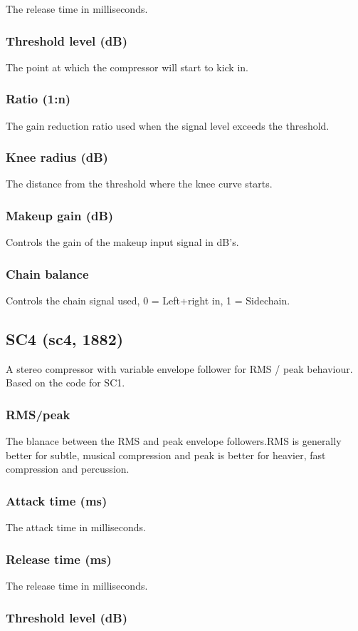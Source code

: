 \documentclass[11pt]{article}
\begin{document}
The release time in milliseconds.\subsubsection*{Threshold level (dB)}
The point at which the compressor will start to kick in.\subsubsection*{Ratio (1:n)}
The gain reduction ratio used when the signal level exceeds the threshold.\subsubsection*{Knee radius (dB)}
The distance from the threshold where the knee curve starts.\subsubsection*{Makeup gain (dB)}
Controls the gain of the makeup input signal in dB's.\subsubsection*{Chain balance}
Controls the chain signal used, 0 = Left+right in, 1 = Sidechain.\subsection{SC4 (sc4, 1882)\label{sc4}\label{id1882}}
A stereo compressor with variable envelope follower for RMS / peak behaviour. Based on the code for SC1.\subsubsection*{RMS/peak}
The blanace between the RMS and peak envelope followers.RMS is generally better for subtle, musical compression and peak is better for heavier, fast compression and percussion.\subsubsection*{Attack time (ms)}
The attack time in milliseconds.\subsubsection*{Release time (ms)}
The release time in milliseconds.\subsubsection*{Threshold level (dB)}
\end{document}
